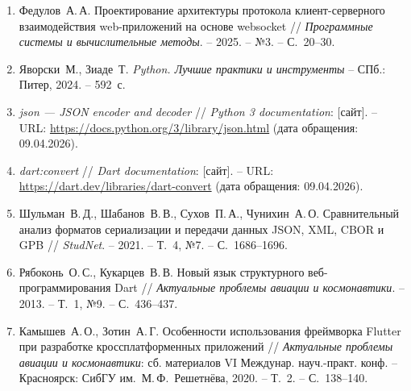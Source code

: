 \documentclass[14pt, russian]{scrartcl}
\begin{document}
\begin{enumerate}
  \item Федулов~А.\,А. Проектирование архитектуры протокола 
  клиент-серверного взаимодействия web-приложений на основе websocket //
  \textit{Программные системы и вычислительные методы}. – 2025. – №3. – С.~20–30.

  \item Яворски~М., Зиаде~Т. \textit{Python. Лучшие практики и инструменты} –
  СПб.: Питер, 2024. – 592~с.

  \item \textit{json --- JSON encoder and decoder} // \textit{Python 3
  documentation}: [сайт]. – URL: \url{https://docs.python.org/3/library/json.html}
  (дата обращения: 09.04.2026).

  \item \textit{dart:convert} // \textit{Dart documentation}: [сайт]. –
  URL: \url{https://dart.dev/libraries/dart-convert} (дата обращения: 09.04.2026).

  \item Шульман~В.\,Д., Шабанов~В.\,В., Сухов~П.\,А., Чунихин~А.\,О.
  Сравнительный анализ форматов сериализации и передачи данных JSON, XML,
  CBOR и GPB // \textit{StudNet}. – 2021. – Т.~4, №7. – С.~1686–1696.

  \item Рябоконь~О.\,С., Кукарцев~В.\,В. Новый язык структурного
  веб-программирования Dart // \textit{Актуальные проблемы авиации и
  космонавтики}. – 2013. – Т.~1, №9. – С.~436–437.

  \item Камышев~А.\,О., Зотин~А.\,Г. Особенности использования фреймворка Flutter при
  разработке кроссплатформенных приложений // \textit{Актуальные проблемы
  авиации и космонавтики}: сб. материалов VI Между\-нар. науч.-практ. конф. –
  Красноярск: СибГУ им.~М.\,Ф.~Решетнёва, 2020. – Т.~2. – С.~138–140.
\end{enumerate}
\end{document}
